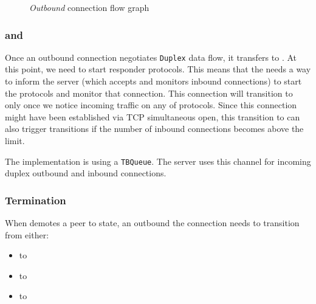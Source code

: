 \begin{figure}[p]
{}
  \caption{\textit{Outbound} connection flow graph}
  \label{fig:outbound_flow}
\end{figure}

\subsubsection{\OutboundStateDup{} and \DuplexState{}}
Once an outbound connection negotiates \texttt{Duplex} data flow, it transfers
to \OutboundStateDup{}.  At this point, we need to start responder protocols.
This means that the \connmngr{} needs a way to inform the server (which
accepts and monitors inbound connections) to start the protocols and monitor
that connection.  This connection will transition to \DuplexState{} only once
we notice incoming traffic on any of \established{} protocols. Since this connection might
have been established via TCP simultaneous open, this transition to \DuplexState{} can
also trigger \Prune{} transitions if the number of inbound connections becomes above
the limit.

\begin{detail}
  The implementation is using a \texttt{TBQueue}. The server uses this channel
  for incoming duplex outbound and inbound connections.
\end{detail}

\subsubsection{Termination}\label{sec:outbound_termination}

When \ptopgov{} demotes a peer to \cold{} state, an outbound
the connection needs to transition from either:

\begin{itemize}
  \item \OutboundStateAny{} to \OutboundIdleStateAny{}
  \item \OutboundStateDupTau{} to \InboundIdleStateDup{}
  \item \DuplexState{} to \InboundStateDup{}
\end{itemize}

